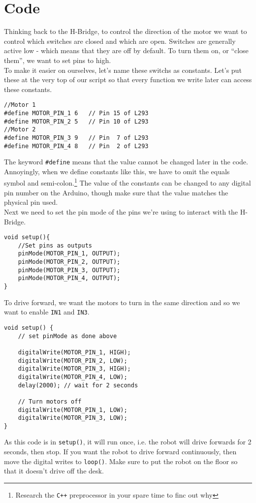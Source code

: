 \documentclass[../TinyBot.tex]{subfiles}
\begin{document}
\section{Code}

Thinking back to the H-Bridge, to control the direction of the motor we want to control which
switches are closed and which are open. Switches are generally active low - which means that 
they are off by default. To turn them on, or ``close them'', we want to set pins to high. \\

To make it easier on ourselves, let's name these switchs as constants. Let's put these
at the very top of our script so that every function we write later can access these constants. \\

\begin{lstlisting}
//Motor 1
#define MOTOR_PIN_1 6   // Pin 15 of L293
#define MOTOR_PIN_2 5   // Pin 10 of L293
//Motor 2
#define MOTOR_PIN_3 9   // Pin  7 of L293
#define MOTOR_PIN_4 8   // Pin  2 of L293
\end{lstlisting}

The keyword \lstinline[]!#define! means that the value cannot be changed later in the code.
Annoyingly, when we define constants like this, we have to omit the equals symbol and
semi-colon.\footnote{Research the \lstinline[]!C++! preprocessor in your spare time to
finc out why} The value of the constants can be changed to any digital pin number on the
Arduino, though make sure that the value matches the physical pin used. \\

Next we need to set the pin mode of the pins we're using to interact with the H-Bridge.

\begin{lstlisting}
void setup(){
    //Set pins as outputs
    pinMode(MOTOR_PIN_1, OUTPUT);
    pinMode(MOTOR_PIN_2, OUTPUT);
    pinMode(MOTOR_PIN_3, OUTPUT);
    pinMode(MOTOR_PIN_4, OUTPUT);
}
\end{lstlisting}


To drive forward, we want the motors to turn in the same direction and so we want to enable \lstinline[]!IN1! and \lstinline[]!IN3!. 

\begin{lstlisting}
void setup() {
    // set pinMode as done above

    digitalWrite(MOTOR_PIN_1, HIGH);
    digitalWrite(MOTOR_PIN_2, LOW);
    digitalWrite(MOTOR_PIN_3, HIGH);
    digitalWrite(MOTOR_PIN_4, LOW);
    delay(2000); // wait for 2 seconds

    // Turn motors off
    digitalWrite(MOTOR_PIN_1, LOW);
    digitalWrite(MOTOR_PIN_3, LOW);
}
\end{lstlisting}
As this code is in \lstinline[]!setup()!, it will run once, i.e. the robot will drive forwards
for 2 seconds, then stop. If you want the robot to drive forward continuously, then move the
digital writes to \lstinline[]!loop()!. Make sure to put the robot on the floor so that it
doesn't drive off the desk. \\
\end{document}
